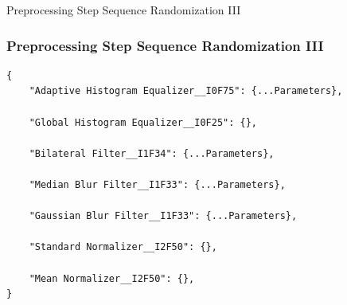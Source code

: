 \begin{frame}[fragile]{Preprocessing Step Sequence Randomization III}
    \frametitle{Preprocessing Step Sequence Randomization III}
    \begin{lstlisting}[label=lst:probabilistic_pipeline_in_json, caption={Probabilistic Pipeline Sequence Definition in JSON Format.}, basicstyle=\scriptsize\ttfamily, stringstyle=\color{black}]
{
    "Adaptive Histogram Equalizer__I0F75": {...Parameters},
    
    "Global Histogram Equalizer__I0F25": {},

    "Bilateral Filter__I1F34": {...Parameters},

    "Median Blur Filter__I1F33": {...Parameters},

    "Gaussian Blur Filter__I1F33": {...Parameters},

    "Standard Normalizer__I2F50": {},

    "Mean Normalizer__I2F50": {},
}
    \end{lstlisting}
\end{frame}

